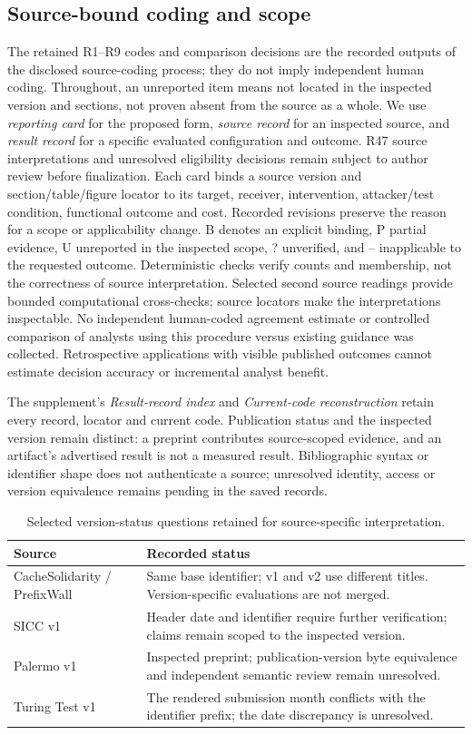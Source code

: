 \subsection{Source-bound coding and scope}
The retained R1--R9 codes and comparison decisions are the recorded outputs of the disclosed source-coding process; they do not imply independent human coding. Throughout, an unreported item means not located in the inspected version and sections, not proven absent from the source as a whole. We use \emph{reporting card} for the proposed form, \emph{source record} for an inspected source, and \emph{result record} for a specific evaluated configuration and outcome.
R47 source interpretations and unresolved eligibility decisions remain subject to author review before finalization. Each card binds a source version and section/table/figure locator to its target, receiver, intervention, attacker/test condition, functional outcome and cost. Recorded revisions preserve the reason for a scope or applicability change. B denotes an explicit binding, P partial evidence, U unreported in the inspected scope, ? unverified, and -- inapplicable to the requested outcome. Deterministic checks verify counts and membership, not the correctness of source interpretation. Selected second source readings provide bounded computational cross-checks; source locators make the interpretations inspectable.
No independent human-coded agreement estimate or controlled comparison of analysts using this procedure versus existing guidance was collected. Retrospective applications with visible published outcomes cannot estimate decision accuracy or incremental analyst benefit.

The supplement's \emph{Result-record index} and \emph{Current-code reconstruction} retain every record, locator and current code. Publication status and the inspected version remain distinct: a preprint contributes source-scoped evidence, and an artifact's advertised result is not a measured result. Bibliographic syntax or identifier shape does not authenticate a source; unresolved identity, access or version equivalence remains pending in the saved records.

\begin{table}[t]\centering\footnotesize
\caption{Selected version-status questions retained for source-specific interpretation.}\label{tab:version-status}
\begin{tabularx}{\columnwidth}{lY}\toprule
Source & Recorded status \\ \midrule
CacheSolidarity / PrefixWall & Same base identifier; v1 and v2 use different titles. Version-specific evaluations are not merged. \\
SICC v1 & Header date and identifier require further verification; claims remain scoped to the inspected version. \\
Palermo v1 & Inspected preprint; publication-version byte equivalence and independent semantic review remain unresolved. \\
Turing Test v1 & The rendered submission month conflicts with the identifier prefix; the date discrepancy is unresolved. \\
\bottomrule\end{tabularx}\end{table}
